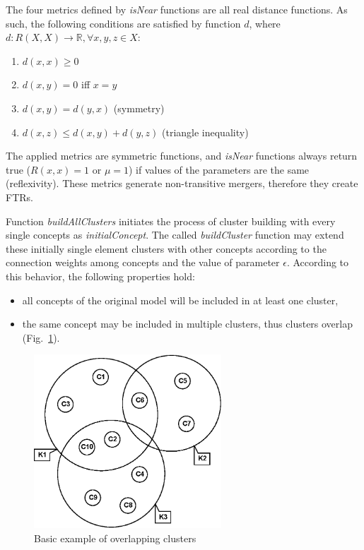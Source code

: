 \documentclass[graybox]{svmult}
\begin{document}
The four metrics defined by \emph{isNear} functions are all real 
distance functions. As such, the following conditions are satisfied by 
function $d$, where $d:R(X,X)\rightarrow \mathbb{R}, \forall x,y,z \in 
X$:

\begin{enumerate}
\item $d(x,x) \geq 0$
\item $d(x,y) = 0$ iff $x=y$
\item $d(x,y) = d(y,x)$ (symmetry)
\item $d(x,z) \leq d(x,y) + d(y,z)$ (triangle inequality)
\end{enumerate}

The applied metrics are symmetric functions, and \emph{isNear} 
functions always return true ($R(x,x) = 1$ or $\mu = 1$) if values of 
the parameters are the same (reflexivity). These metrics generate 
non-transitive mergers, therefore they create FTRs.

Function \emph{buildAllClusters} initiates the process of cluster 
building with every single concepts as \emph{initialConcept}. The called 
\emph{buildCluster} function may extend these initially single element 
clusters with other concepts according to the connection weights among 
concepts and the value of parameter $\epsilon$. According to this 
behavior, the following properties hold:

\begin{itemize}
  \item all concepts of the original model will be included in at least one cluster, 
  \item the same concept may be included in multiple clusters, thus 
  clusters overlap (Fig.~\ref{fig:overlapping}).
\end{itemize}

\begin{figure}[hbt]
  \sidecaption
  \includegraphics[width=7cm]{clusters.eps}
  \caption{Basic example of overlapping clusters \cite{hatwagnerm.f.koczyl.t.2015}}
  \label{fig:overlapping}
\end{figure}
\end{document}
